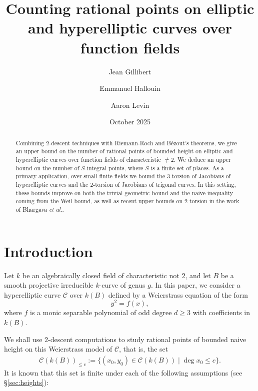\documentclass[11pt]{article}
\theoremstyle{plain}
\theoremstyle{definition}
\begin{document}
\title{Counting rational points on elliptic and hyperelliptic curves over function fields}

\author{Jean Gillibert \and Emmanuel Hallouin \and Aaron Levin}

\date{October 2025}

\maketitle

\begin{abstract}
Combining $2$-descent techniques with Riemann-Roch and B{\'e}zout's theorems, we give an upper bound on the number of rational points of bounded height on elliptic and hyperelliptic curves over function fields of characteristic $\neq 2$. We deduce an upper bound on the number of $S$-integral points, where $S$ is a finite set of places. As a primary application, over small finite fields we bound the $3$-torsion of Jacobians of hyperelliptic curves and the $2$-torsion of Jacobians of trigonal curves. In this setting, these bounds improve on both the trivial geometric bound and the naive inequality coming from the Weil bound, as well as recent upper bounds on $2$-torsion in the work of Bhargava \emph{et al.}.
\end{abstract}




\section{Introduction}

Let $k$ be an algebraically closed field of characteristic not $2$, and let $B$ be a smooth projective irreducible $k$-curve of genus $g$.
In this paper, we consider a hyperelliptic curve $\mathcal{C}$ over $k(B)$ defined by a Weierstrass equation of the form
\begin{equation}
\label{eq:C}
y^2 = f(x),
\end{equation}
where $f$ is a monic separable polynomial of odd degree $d\geq 3$ with coefficients in $k(B)$.

We shall use $2$-descent computations to study rational points of bounded naive height on this Weierstrass model of $\mathcal{C}$, that is, the set
\begin{align*}
\mathcal{C}(k(B))_{\leq c}:=\{(x_0,y_0)\in \mathcal{C}(k(B))\mid \deg x_0\leq c\}.
\end{align*}
It is known that this set is finite under each of the following assumptions (see \S{}\ref{sec:heights}):
\end{document}
